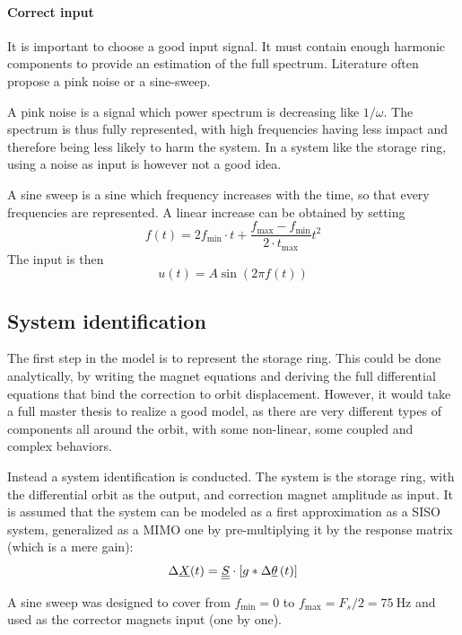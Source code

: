 \paragraph{Correct input}
It is important to choose a good input signal. It must contain enough harmonic components to provide an estimation of the full spectrum. Literature often propose a pink noise or a sine-sweep.

A pink noise is a signal which power spectrum is decreasing like $1/\omega$. The spectrum is thus fully represented, with high frequencies having less impact and therefore being less likely to harm the system. In a system like the storage ring, using a noise as input is however not a good idea. 

A sine sweep is a sine which frequency increases with the time, so that every frequencies are represented. A linear increase can be obtained by setting
\begin{equation}
	f(t) = 2 f_\text{min} \cdot t + \frac{f_\text{max}-f_\text{min}}{2 \cdot t_\text{max}} t^2
\end{equation}
The input is then
\begin{equation}
	u(t) = A \sin(2\pi f(t))
\end{equation}



\subsection{System identification}
The first step in the model is to represent the storage ring. This could be done analytically, by writing the magnet equations and deriving the full differential equations that bind the correction to orbit displacement. However, it would take a full master thesis to realize a good model, as there are very different types of components all around the orbit, with some non-linear, some coupled and complex behaviors.

Instead a system identification is conducted. The system is the storage ring, with the differential orbit as the output, and correction magnet amplitude as input. It is assumed that the system can be modeled as a first approximation as a SISO system, generalized as a MIMO one by pre-multiplying it by the response matrix (which is a mere gain):
\begin{equation}
	\Delta \underline{X}(t) = \underline{\underline{S}}\cdot \left[ g * \Delta\underline{\theta} \, (t) \right]
\end{equation}

A sine sweep was designed to cover from $f_\text{min} = 0$ to $f_\text{max} = F_s/2 = \SI{75}{\hertz}$ and used as the corrector magnets input (one by one).

